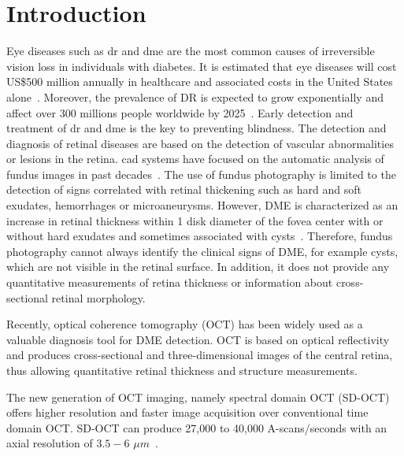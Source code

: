 \graphicspath{ {./content/intro/figures/} }

\section{Introduction}

Eye diseases such as \ac{dr} and {dme} are the most common causes of irreversible vision loss in individuals with diabetes. It is estimated that eye diseases will cost US\$500 million annually in healthcare and associated costs in the United States alone~\cite{Sharma2005}. Moreover, the prevalence of DR is expected to grow exponentially and affect over 300 millions people worldwide by 2025~\cite{Wild2004}.
Early detection and treatment of \ac{dr} and \ac{dme} is the key to preventing blindness.
The detection and diagnosis of retinal diseases are based on the detection of vascular abnormalities or lesions in the retina. 
\Ac{cad} systems have focused on the automatic analysis of fundus images in past decades~\cite{Abramoff2010,Trucco2013}.
The use of fundus photography is limited to the detection of signs correlated with retinal thickening such as hard and soft exudates, hemorrhages or microaneurysms.
However, DME is characterized as an increase in retinal thickness within 1 disk diameter of the fovea center with or without hard exudates and sometimes associated with cysts~\cite{ETDRSG1985}.
Therefore, fundus photography cannot always identify the clinical signs of DME, for example cysts, which are not visible in the retinal surface. In addition, it does not provide any quantitative measurements of retina thickness or information about cross-sectional retinal morphology. 

Recently, optical coherence tomography (OCT) has been widely used as a valuable diagnosis tool for DME detection.
OCT is based on optical reflectivity and produces cross-sectional and three-dimensional images of the central retina, thus allowing quantitative retinal thickness and structure measurements. 

The new generation of OCT imaging, namely spectral domain OCT (SD-OCT) offers higher resolution and faster image acquisition over conventional time domain OCT. SD-OCT can produce 27,000 to 40,000 A-scans/seconds with an axial resolution of $3.5-6$ $\mu m$~\cite{Chen2005}. 

